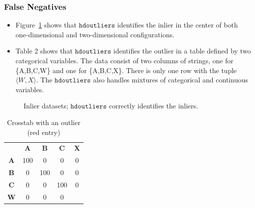 \documentclass[12pt]{article}
\begin{document}
\subsubsection{False Negatives}
\begin{itemize}
\setlength\itemsep{0em}
\item Figure~\ref{fig:inliers} shows that $\mathtt{hdoutliers}$  identifies the inlier in the center of both one-dimensional and two-dimensional configurations.

\item Table 2 shows that $\mathtt{hdoutliers}$  identifies the outlier in a table defined by two categorical variables. The data consist of two columns of strings, one for \{A,B,C,W\} and one for \{A,B,C,X\}. There is only one row with the tuple $\langle W,X \rangle$. The $\mathtt{hdoutliers}$ also handles mixtures of categorical and continuous variables.
\end{itemize}

\begin{figure}[h]
\caption{\label{fig:inliers} Inlier datasets; $\mathtt{hdoutliers}$ correctly identifies the inliers.}
\end{figure}

\begin{table}[h]
 \caption{\label{crosstab} Crosstab with an outlier (red entry)}
 \scriptsize
 \begin{center}
   \begin{tabular}{ccccc}
      & {\bf A} & {\bf B} & {\bf C} & {\bf X}\\

     {\bf A} & 100 & 0 & 0 & 0\\
     {\bf B} & 0 & 100 & 0 & 0\\
     {\bf C} & 0 & 0 & 100 & 0\\
     {\bf W} & 0 & 0 & 0 & \color{red}{\bf 1}\color{black}\\
   \end{tabular}
 \end{center}
\end{table}
\end{document}
